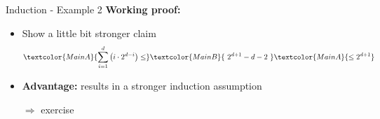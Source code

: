 
\begin{frame}{Induction - Example 2}
  \textbf{Working proof:}
  \begin{itemize}
    \item
      Show a {\color{MainB}little bit stronger} claim
      \begin{displaymath}
        \textcolor{MainA}{\sum_{i=1}^{d} \left(i \cdot 2^{d-i}\right) \leq}
        \textcolor{MainB}{~2^{d+1} - d - 2~}
        \textcolor{MainA}{\leq 2^{d+1}}
      \end{displaymath}
    \item<2- |handout:1>
      \textbf{Advantage:}
      results in a stronger induction assumption
      \begin{center}
        \color{MainB}$\Rightarrow$ exercise
      \end{center}
  \end{itemize}
\end{frame}
